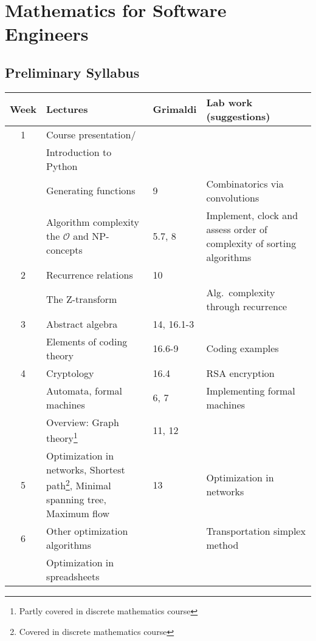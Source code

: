 \documentclass[10pt]{article}
\begin{document}
\section*{Mathematics for Software Engineers}
\subsection*{Preliminary Syllabus}

\vspace{3ex}
\savenotes
\begin{tabular}{|c|p{}|p{}|
    p{}|}
  \hline
  Week&Lectures&Grimaldi&Lab work (suggestions)\\
  \hline %
  1 & Course presentation/  & & \\
    & Introduction to Python & &
  \\
  & Generating functions
  & 9 & Combinatorics via convolutions
  \\ \hline
  & Algorithm complexity \hfill\break
    the $\mathcal{O}$ and NP-concepts & 5.7, 8 &
  Implement, clock and assess order of complexity of sorting algorithms
  \\\hline %
  2 & Recurrence relations & 10 & \\
    & The Z-transform      &    & Alg.~complexity through recurrence
  \\
  \hline
  3 & Abstract algebra&14, 16.1-3&\\
    & Elements of coding theory&16.6-9& Coding examples \\
  \hline
  4& Cryptology & 16.4 &RSA encryption\footnotemark[2]\\
   &Automata, formal machines&6, 7&Implementing formal machines\\
  & Overview: Graph theory\footnote{Partly covered in discrete
    mathematics course} & 11, 12 & \\
  \hline
  5& Optimization in networks,\hfill\break
    Shortest path\footnote{Covered in discrete mathematics course},\hfill\break
    Minimal spanning tree\footnotemark[2],\hfill\break
    Maximum flow&13&Optimization in networks\\
  \hline
  6&Other optimization algorithms&
  &Transportation simplex method\\
  &Optimization in spreadsheets&&\\
  \hline
\end{tabular}
\spewnotes
\vspace{3ex}
\end{document}
